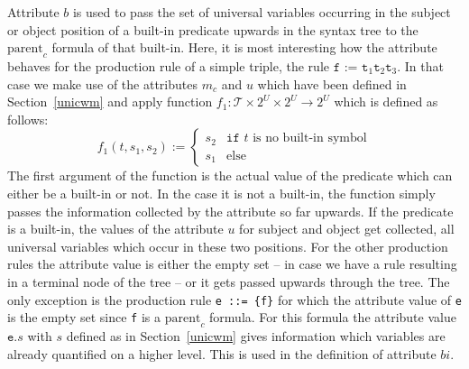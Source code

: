 Attribute $b$ is used to pass the set of universal variables occurring in the subject or object position of a built-in predicate upwards in the syntax tree to the 
$\text{parent}_c$ formula of that built-in. Here, it is most interesting how the attribute behaves for the production rule of a simple triple, 
\ie the rule $\texttt{f := t}_1 \texttt{t}_2 \texttt{t}_3$. In that case we make use of the attributes $m_c$ and $u$ which have been defined in Section~\ref{unicwm} 
and apply function $f_1: \mathcal{T}\times 2^{U}\times 2^{U}\rightarrow 2^{U}$  which 
is defined as follows: 
%
\[
 f_1(t, s_1, s_2) :=\begin{cases} s_2 & \texttt{if } t \text{ is no built-in symbol} \\ s_1 & \text{else} \end{cases} 
\]
The first argument of the function is the actual value of the predicate which can either be a built-in or not. In the case it is not a built-in, 
the function simply passes the information collected by the attribute so far upwards. If the predicate is a built-in, the values of the attribute $u$ for
subject and object get 
collected, \ie all universal variables which occur in these two positions. For the other production rules the attribute value is either the empty set 
-- in case we have a rule resulting in a terminal node of the tree -- or it gets passed upwards through the tree. The only exception is the production rule
\texttt{e ::= \{f\}} for which the attribute value of \texttt{e} is the empty set since \texttt{f} is a $\text{parent}_c$ formula. For this formula the attribute 
value $\texttt{e}.s$ with $s$ defined as in Section~\ref{unicwm} gives information which variables are already quantified on a higher level. This is used 
in the definition of attribute $bi$.

